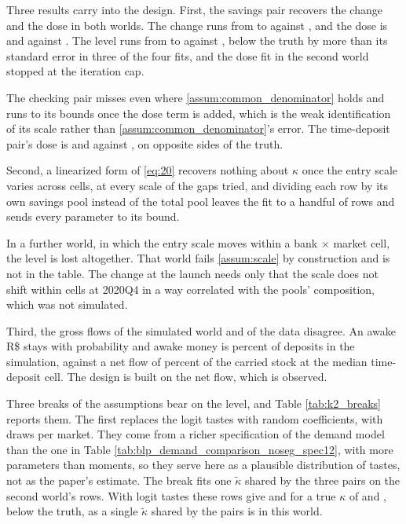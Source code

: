 Three results carry into the design. First, the savings pair recovers the change and the dose in both worlds. The change runs from  to  against , and the dose is  and  against . The level runs from  to  against , below the truth by more than its standard error in three of the four fits, and the dose fit in the second world stopped at the iteration cap.

The checking pair misses even where \ref{assum:common_denominator} holds and runs to its bounds once the dose term is added, which is the weak identification of its scale rather than \ref{assum:common_denominator}'s error. The time-deposit pair's dose is  and  against , on opposite sides of the truth.

Second, a linearized form of \eqref{eq:20} recovers nothing about $\kappa$ once the entry scale varies across cells, at every scale of the gaps tried, and dividing each row by its own savings pool instead of the total pool leaves the fit to a handful of rows and sends every parameter to its bound.

In a further world, in which the entry scale moves within a bank $\times$ market cell, the level is lost altogether. That world fails \ref{assum:scale} by construction and is not in the table. The change at the launch needs only that the scale does not shift within cells at 2020Q4 in a way correlated with the pools' composition, which was not simulated.

Third, the gross flows of the simulated world and of the data disagree. An awake R\$ stays with probability  and awake money is  percent of deposits in the simulation, against a net flow of  percent of the carried stock at the median time-deposit cell. The design is built on the net flow, which is observed.

Three breaks of the assumptions bear on the level, and Table \ref{tab:k2_breaks} reports them. The first replaces the logit tastes with random coefficients, with  draws per market. They come from a richer specification of the demand model than the one in Table \ref{tab:blp_demand_comparison_noseg_spec12}, with more parameters than moments, so they serve here as a plausible distribution of tastes, not as the paper's estimate. The break fits one $\tilde{\kappa}$ shared by the three pairs on the second world's rows. With logit tastes these rows give  and  for a true $\kappa$ of  and , below the truth, as a single $\tilde{\kappa}$ shared by the pairs is in this world.

